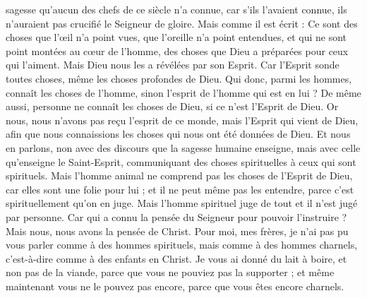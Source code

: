 \begin{multicols}{2}
sagesse qu’aucun des chefs de ce siècle n'a connue, car s'ils l’avaient connue, ils n’auraient pas crucifié le Seigneur de gloire.
Mais comme il est écrit : Ce sont des choses que l’œil n'a point vues, que l'oreille n'a point entendues, et qui ne sont point montées au cœur de l'homme, des choses que Dieu a préparées pour ceux qui l’aiment.
Mais Dieu nous les a révélées par son Esprit. Car l'Esprit sonde toutes choses, même les choses profondes de Dieu.
Qui donc, parmi les hommes, connaît les choses de l'homme, sinon l’esprit de l'homme qui est en lui ? De même aussi, personne ne connaît les choses de Dieu, si ce n’est l'Esprit de Dieu.
Or nous, nous n’avons pas reçu l'esprit de ce monde, mais l'Esprit qui vient de Dieu, afin que nous connaissions les choses qui nous ont été données de Dieu.
Et nous en parlons, non avec des discours que la sagesse humaine enseigne, mais avec celle qu'enseigne le Saint-Esprit, communiquant des choses spirituelles à ceux qui sont spirituels.
Mais l'homme animal ne comprend pas les choses de l'Esprit de Dieu, car elles sont une folie pour lui ; et il ne peut même pas les entendre, parce c’est spirituellement qu’on en juge.
Mais l'homme spirituel juge de tout et il n'est jugé par personne.
Car qui a connu la pensée du Seigneur pour pouvoir l’instruire ? Mais nous, nous avons la pensée de Christ.
\VerseOne{}Pour moi, mes frères, je n'ai pas pu vous parler comme à des hommes spirituels, mais comme à des hommes charnels, c'est-à-dire comme à des enfants en Christ.
Je vous ai donné du lait à boire, et non pas de la viande, parce que vous ne pouviez pas la supporter ; et même maintenant vous ne le pouvez pas encore, parce que vous êtes encore charnels.

\end{multicols}
